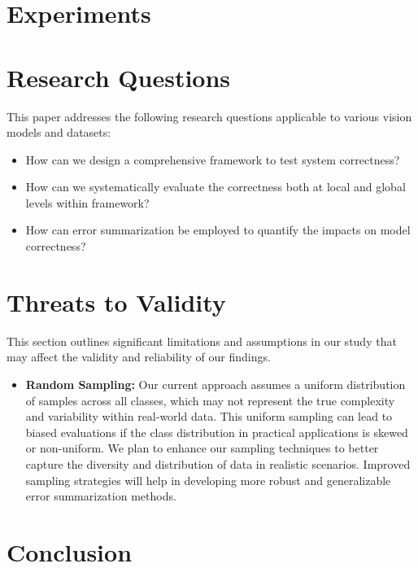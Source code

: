 \documentclass[10pt, conference, a4paper, final]{IEEEtran}
\begin{document}
\section{Experiments}

\section{Research Questions}

This paper addresses the following research questions applicable to various vision models and datasets:

\begin{itemize}
    \item How can we design a comprehensive framework to test system correctness?
    \item How can we systematically evaluate the correctness both at local and global levels within framework?
    \item How can error summarization be employed to quantify the impacts on model correctness?
 
\end{itemize}
\section{Threats to Validity}

This section outlines significant limitations and assumptions in our study that may affect the validity and reliability of our findings.

\begin{itemize}
    \item \textbf{Random Sampling:} Our current approach assumes a uniform distribution of samples across all classes, which may not represent the true complexity and variability within real-world data. This uniform sampling can lead to biased evaluations if the class distribution in practical applications is skewed or non-uniform. We plan to enhance our sampling techniques to better capture the diversity and distribution of data in realistic scenarios. Improved sampling strategies will help in developing more robust and generalizable error summarization methods.
\end{itemize}


\section{Conclusion}
\end{document}
